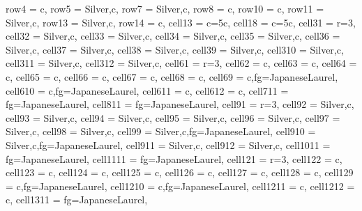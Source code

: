 \begin{table}[H]
    \centering
    \begin{tblr}{
            row{4} = {c},
            row{5} = {Silver,c},
            row{7} = {Silver,c},
            row{8} = {c},
            row{10} = {c},
            row{11} = {Silver,c},
            row{13} = {Silver,c},
            row{14} = {c},
            cell{1}{3} = {c=5}{c},
            cell{1}{8} = {c=5}{c},
            cell{3}{1} = {r=3}{},
            cell{3}{2} = {Silver,c},
            cell{3}{3} = {Silver,c},
            cell{3}{4} = {Silver,c},
            cell{3}{5} = {Silver,c},
            cell{3}{6} = {Silver,c},
            cell{3}{7} = {Silver,c},
            cell{3}{8} = {Silver,c},
            cell{3}{9} = {Silver,c},
            cell{3}{10} = {Silver,c},
            cell{3}{11} = {Silver,c},
            cell{3}{12} = {Silver,c},
            cell{6}{1} = {r=3}{},
            cell{6}{2} = {c},
            cell{6}{3} = {c},
            cell{6}{4} = {c},
            cell{6}{5} = {c},
            cell{6}{6} = {c},
            cell{6}{7} = {c},
            cell{6}{8} = {c},
            cell{6}{9} = {c,fg=JapaneseLaurel},
            cell{6}{10} = {c,fg=JapaneseLaurel},
            cell{6}{11} = {c},
            cell{6}{12} = {c},
            cell{7}{11} = {fg=JapaneseLaurel},
            cell{8}{11} = {fg=JapaneseLaurel},
            cell{9}{1} = {r=3}{},
            cell{9}{2} = {Silver,c},
            cell{9}{3} = {Silver,c},
            cell{9}{4} = {Silver,c},
            cell{9}{5} = {Silver,c},
            cell{9}{6} = {Silver,c},
            cell{9}{7} = {Silver,c},
            cell{9}{8} = {Silver,c},
            cell{9}{9} = {Silver,c,fg=JapaneseLaurel},
            cell{9}{10} = {Silver,c,fg=JapaneseLaurel},
            cell{9}{11} = {Silver,c},
            cell{9}{12} = {Silver,c},
            cell{10}{11} = {fg=JapaneseLaurel},
            cell{11}{11} = {fg=JapaneseLaurel},
            cell{12}{1} = {r=3}{},
            cell{12}{2} = {c},
            cell{12}{3} = {c},
            cell{12}{4} = {c},
            cell{12}{5} = {c},
            cell{12}{6} = {c},
            cell{12}{7} = {c},
            cell{12}{8} = {c},
            cell{12}{9} = {c,fg=JapaneseLaurel},
            cell{12}{10} = {c,fg=JapaneseLaurel},
            cell{12}{11} = {c},
            cell{12}{12} = {c},
            cell{13}{11} = {fg=JapaneseLaurel},
}
\end{tblr}
\end{table}
